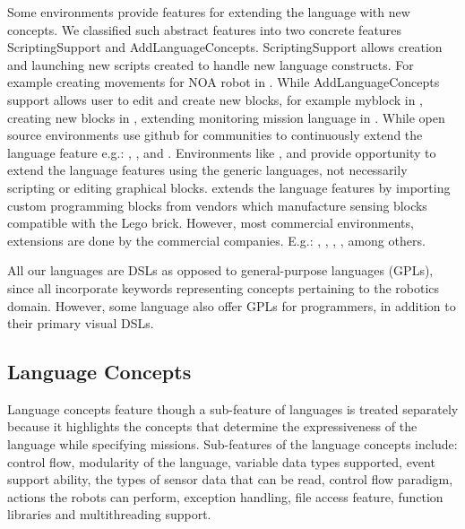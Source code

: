 Some environments provide features for extending the language with new concepts. We classified such abstract features into two concrete features ScriptingSupport and AddLanguageConcepts. %
ScriptingSupport allows creation and launching new scripts created to handle new language constructs. For example creating movements for NOA robot in \choregraphe.
 While AddLanguageConcepts support allows user to edit and create new blocks, for example myblock in \makeblock, creating new blocks in \tivipe, extending monitoring mission language in \flyaq.  While open source environments use github for communities to continuously extend the language feature e.g.: \sphero, \openroberta, and \flyaq. Environments like \easyc, \flyaq and \missionlab provide opportunity to extend the language features using the generic languages, not necessarily scripting or editing graphical blocks.
\lego extends the language features by importing custom programming blocks from vendors which manufacture sensing blocks compatible with the Lego brick. However, most commercial environments, extensions  are done by the commercial companies. E.g.: \arcbotics, \edison, \blocklyprop, \vex, \robotmesh among others.

 All our languages are DSLs as opposed to general-purpose languages (GPLs), since all incorporate keywords representing concepts pertaining to the robotics domain. However, some language also offer GPLs for programmers, in addition to their primary visual DSLs.



\subsection{Language Concepts}\label{sec:langconcepts}
Language concepts feature though a sub-feature of languages is treated separately because it highlights the concepts that determine the expressiveness of the language while specifying missions. Sub-features of the language concepts include: control flow, modularity of the language, variable data types supported, event support ability, the types of sensor data that can be read, control flow paradigm, actions the robots can perform, exception handling, file access feature, function libraries and multithreading support.

